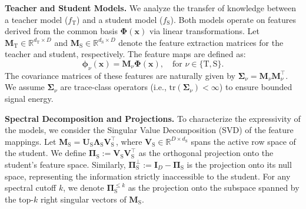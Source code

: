 \documentclass{article}
\theoremstyle{definition}
\theoremstyle{definition}
\newtheorem{remark}{Remark}
\theoremstyle{plain}
\theoremstyle{plain}
\theoremstyle{plain}
\theoremstyle{plain}
\theoremstyle{plain}
\newcommand{\tr}{\mathrm{tr}}
\newcommand{\te}{\mathrm{T}}
\newcommand{\st}{\mathrm{S}}
\begin{document}
\textbf{Teacher and Student Models.}
We analyze the transfer of knowledge between a teacher model ($f_\te$) and a student model ($f_\st$). Both models operate on features derived from the common basis $\mathbf{\Phi}(\mathbf{x})$ via linear transformations. Let $\mathbf{M}_\te \in \mathbb{R}^{d_\te \times D}$ and $\mathbf{M}_\st \in \mathbb{R}^{d_\st \times D}$ denote the feature extraction matrices for the teacher and student, respectively. The feature maps are defined as:
\begin{equation}
    \boldsymbol{\phi}_\nu(\mathbf{x}) = \mathbf{M}_\nu \mathbf{\Phi}(\mathbf{x}), \quad \text{for } \nu \in \{\te, \st\}.
\end{equation}
The covariance matrices of these features are naturally given by $\mathbf{\Sigma}_\nu = \mathbf{M}_\nu \mathbf{M}_\nu^\top$. We assume $\mathbf{\Sigma}_\nu$ are trace-class operators (i.e., $\tr(\mathbf{\Sigma}_\nu) < \infty$) to ensure bounded signal energy.

\textbf{Spectral Decomposition and Projections.}
To characterize the expressivity of the models, we consider the Singular Value Decomposition (SVD) of the feature mappings. Let $\mathbf{M}_\st = \mathbf{U}_\st \mathbf{\Lambda}_\st \mathbf{V}_\st^\top$, where $\mathbf{V}_\st \in \mathbb{R}^{D \times d_\st}$ spans the active row space of the student.
We define $\mathbf{\Pi}_\st := \mathbf{V}_\st\mathbf{V}_\st^\top$ as the orthogonal projection onto the student's feature space. Similarly, $\mathbf{\Pi}_\st^\perp := \mathbf{I}_D - \mathbf{\Pi}_\st$ is the projection onto its null space, representing the information strictly inaccessible to the student.
For any spectral cutoff $k$, we denote $\mathbf{\Pi}_\st^{\le k}$ as the projection onto the subspace spanned by the top-$k$ right singular vectors of $\mathbf{M}_\st$.
\end{document}
